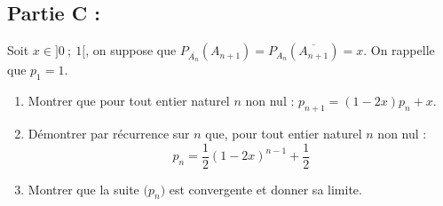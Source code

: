 \documentclass[10pt]{article}
\begin{document}
\subsection*{Partie C :}

Soit $x \in ]0 ~;~ 1[$, on suppose que $P_{\overline{A_{n}}}\left(A_{n+1}\right)=P_{A_{n}}\left(\overline{A_{n+1}}\right)=x$. On rappelle que $p_{1}=1$.

\begin{enumerate}
\item Montrer que pour tout entier naturel $n$ non nul : $p_{n+1}=(1 - 2x) p_{n}+x$.

\item Démontrer par récurrence sur $n$ que, pour tout entier naturel $n$ non nul :
		\[p_{n}=\dfrac{1}{2}(1-2 x)^{n-1}+\dfrac{1}{2}\]

\item Montrer que la suite $\big(p_{n}\big)$ est convergente et donner sa limite.
\end{enumerate}
\end{document}
